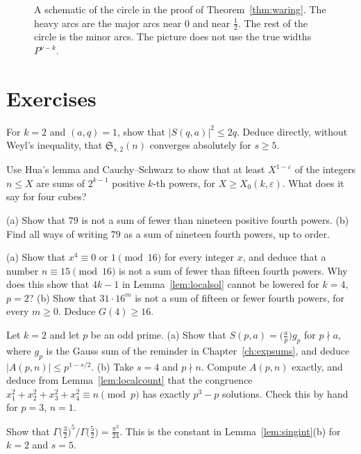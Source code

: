 \begin{figure}[ht]
\centering
{}
\caption{A schematic of the circle in the proof of Theorem~\ref{thm:waring}. The heavy arcs are the major arcs near $0$ and near $\frac12$. The rest of the circle is the minor arcs. The picture does not use the true widths $P^{\nu-k}$.}
\label{fig:v14-extra-06-b}
\end{figure}

\section{Exercises}

\begin{exercise}[$\star$]\label{ex:gausssq}
For $k=2$ and $(a,q)=1$, show that $|S(q,a)|^2\le2q$. Deduce directly, without Weyl's inequality, that $\mathfrak S_{s,2}(n)$ converges absolutely for $s\ge5$.
\end{exercise}
\begin{exercise}[$\star\star$]\label{ex:density}
Use Hua's lemma and Cauchy--Schwarz to show that at least $X^{1-\varepsilon}$ of the integers $n\le X$ are sums of $2^{k-1}$ positive $k$-th powers, for $X\ge X_0(k,\varepsilon)$. What does it say for four cubes?
\end{exercise}
\begin{exercise}[$\star$]\label{ex:g4}
(a) Show that $79$ is not a sum of fewer than nineteen positive fourth powers. (b) Find all ways of writing $79$ as a sum of nineteen fourth powers, up to order.
\end{exercise}
\begin{exercise}[$\star\star$]\label{ex:sharp4k}
(a) Show that $x^4\equiv0$ or $1\pmod{16}$ for every integer $x$, and deduce that a number $n\equiv15\pmod{16}$ is not a sum of fewer than fifteen fourth powers. Why does this show that $4k-1$ in Lemma~\ref{lem:localsol} cannot be lowered for $k=4$, $p=2$?
(b) Show that $31\cdot16^m$ is not a sum of fifteen or fewer fourth powers, for every $m\ge0$. Deduce $G(4)\ge16$.
\end{exercise}
\begin{exercise}[$\star\star\star$]\label{ex:foursq}
Let $k=2$ and let $p$ be an odd prime.
(a) Show that $S(p,a)=\bigl(\frac ap\bigr)g_p$ for $p\nmid a$, where $g_p$ is the Gauss sum of the reminder in Chapter~\ref{ch:expsums}, and deduce $|A(p,n)|\le p^{1-s/2}$.
(b) Take $s=4$ and $p\nmid n$. Compute $A(p,n)$ exactly, and deduce from Lemma~\ref{lem:localcount} that the congruence $x_1^2+x_2^2+x_3^2+x_4^2\equiv n\pmod p$ has exactly $p^3-p$ solutions. Check this by hand for $p=3$, $n=1$.
\end{exercise}
\begin{exercise}[$\star$]\label{ex:v14-extra-06-1}
Show that $\Gamma\bigl(\frac32\bigr)^5\big/\Gamma\bigl(\frac52\bigr)=\frac{\pi^2}{24}$. This is the constant in Lemma~\ref{lem:singint}(b) for $k=2$ and $s=5$.
\end{exercise}

